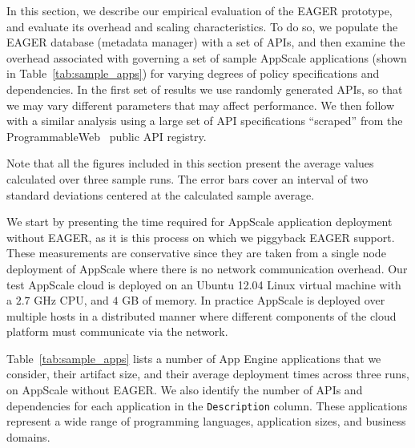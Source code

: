 In this section, we describe our empirical evaluation of the EAGER
prototype, and evaluate its overhead and scaling characteristics.
To do so, we populate the EAGER database (metadata manager) with a set of APIs, and then examine
the overhead associated with governing a set of sample AppScale applications (shown in Table~\ref{tab:sample_apps}) 
for varying degrees of policy specifications and
dependencies.
In the first set of results we use randomly generated APIs, so that we may vary
different parameters that may affect performance.  We then follow with a
similar analysis using a large
set of API specifications ``scraped'' from the ProgrammableWeb~\cite{pweb}
public API registry.

Note that all the figures included in this section present the average values calculated
over three sample runs. The error bars cover an interval of two standard deviations centered
at the calculated sample average.
 
We start by presenting the time required for AppScale application deployment
without EAGER, as it is this process on which we piggyback EAGER support.  
These measurements are conservative since they are taken 
from a single node deployment of AppScale where there is no network communication
overhead. Our test AppScale cloud
is deployed on an Ubuntu 12.04 Linux virtual machine with a
$2.7$ GHz CPU, and $4$ GB of memory. In practice AppScale is
deployed over multiple hosts in a distributed manner where different components
of the cloud platform must communicate via the network.

Table~\ref{tab:sample_apps} lists a number of App Engine
applications that we consider, their artifact size, and their average deployment times 
across three runs, on AppScale without EAGER.
We also identify the number of APIs and dependencies for each 
application in the \texttt{Description} column.
These applications represent a wide range of programming languages,
application sizes, and business domains.  

